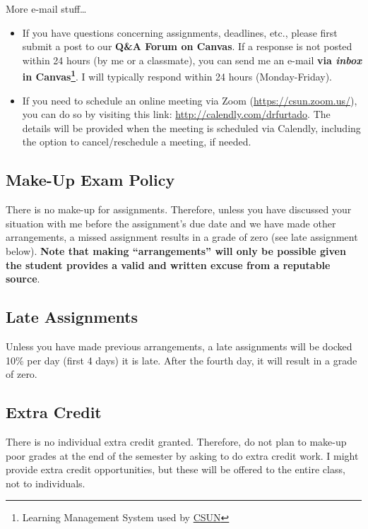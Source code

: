 \documentclass[11pt,]{article}
\begin{document}
More e-mail stuff\ldots{}

\begin{itemize}
\item
  If you have questions concerning assignments, deadlines, etc., please
  first submit a post to our \textbf{Q\&A Forum on Canvas}. If a
  response is not posted within 24 hours (by me or a classmate), you can
  send me an e-mail \textbf{via \emph{inbox} in Canvas\footnote{Learning
    Management System used by
    \href{https://www.csun.edu/it/canvas}{CSUN}}}. I will typically
  respond within 24 hours (Monday-Friday).
\item
  If you need to schedule an online meeting via Zoom
  (\url{https://csun.zoom.us/}), you can do so by visiting this link:
  \url{http://calendly.com/drfurtado}. The details will be provided when
  the meeting is scheduled via Calendly, including the option to
  cancel/reschedule a meeting, if needed.
\end{itemize}

\hypertarget{make-up-exam-policy}{%
\subsection{Make-Up Exam Policy}\label{make-up-exam-policy}}

There is no make-up for assignments. Therefore, unless you have
discussed your situation with me before the assignment's due date and we
have made other arrangements, a missed assignment results in a grade of
zero (see late assignment below). \textbf{Note that making
``arrangements'' will only be possible given the student provides a
valid and written excuse from a reputable source}.

\hypertarget{late-assignments}{%
\subsection{Late Assignments}\label{late-assignments}}

Unless you have made previous arrangements, a late assignments will be
docked 10\% per day (first 4 days) it is late. After the fourth day, it
will result in a grade of zero.

\hypertarget{extra-credit}{%
\subsection{Extra Credit}\label{extra-credit}}

There is no individual extra credit granted. Therefore, do not plan to
make-up poor grades at the end of the semester by asking to do extra
credit work. I might provide extra credit opportunities, but these will
be offered to the entire class, not to individuals.
\end{document}
